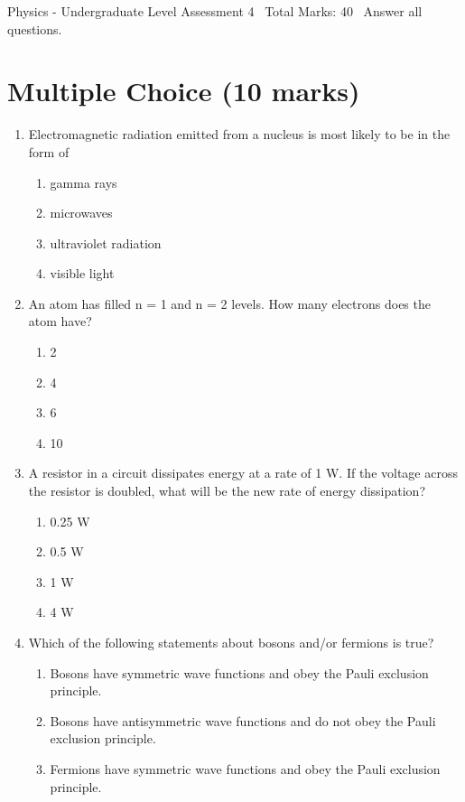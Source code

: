 \documentclass[12pt]{article}
\begin{document}
\begin{center}
Physics - Undergraduate Level Assessment 4 \
Total Marks: 40 \
Answer all questions.
\end{center}

\section*{Multiple Choice (10 marks)}
\begin{enumerate}[label=\arabic*.]
\item Electromagnetic radiation emitted from a nucleus is most likely to be in the form of
\begin{enumerate}[label=(\alph*)]
    \item gamma rays
    \item microwaves
    \item ultraviolet radiation
    \item visible light
\end{enumerate}
\item An atom has filled n = 1 and n = 2 levels. How many electrons does the atom have?
\begin{enumerate}[label=(\alph*)]
    \item 2
    \item 4
    \item 6
    \item 10
\end{enumerate}
\item A resistor in a circuit dissipates energy at a rate of 1 W. If the voltage across the resistor is doubled, what will be the new rate of energy dissipation?
\begin{enumerate}[label=(\alph*)]
    \item 0.25 W
    \item 0.5 W
    \item 1 W
    \item 4 W
\end{enumerate}
\item Which of the following statements about bosons and/or fermions is true?
\begin{enumerate}[label=(\alph*)]
    \item Bosons have symmetric wave functions and obey the Pauli exclusion principle.
    \item Bosons have antisymmetric wave functions and do not obey the Pauli exclusion principle.
    \item Fermions have symmetric wave functions and obey the Pauli exclusion principle.

\end{enumerate}
\end{enumerate}
\end{document}
